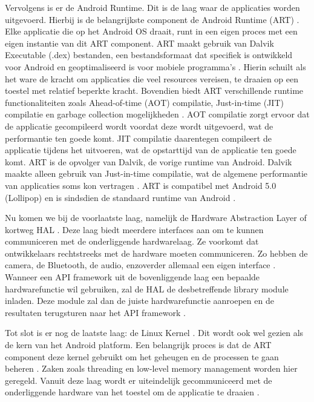 Vervolgens is er de Android Runtime. Dit is de laag waar de applicaties worden uitgevoerd. Hierbij is de belangrijkste component de Android Runtime (ART) \autocite{Bron7}. Elke applicatie die op het Android OS draait, runt in een eigen proces met een eigen instantie van dit ART component. ART maakt gebruik van Dalvik Executable (.dex) bestanden, een bestandsformaat dat specifiek is ontwikkeld voor Android en geoptimaliseerd is voor mobiele programma's \autocite{Bron14}. Hierin schuilt als het ware de kracht om applicaties die veel resources vereisen, te draaien op een toestel met relatief beperkte kracht. Bovendien biedt ART verschillende runtime functionaliteiten zoals Ahead-of-time (AOT) compilatie, Just-in-time (JIT) compilatie en garbage collection mogelijkheden \autocite{Bron7, Bron14}. AOT compilatie zorgt ervoor dat de applicatie gecompileerd wordt voordat deze wordt uitgevoerd, wat de performantie ten goede komt. JIT compilatie daarentegen compileert de applicatie tijdens het uitvoeren, wat de opstarttijd van de applicatie ten goede komt. ART is de opvolger van Dalvik, de vorige runtime van Android. Dalvik maakte alleen gebruik van Just-in-time compilatie, wat de algemene performantie van applicaties soms kon vertragen \autocite{Bron13}. ART is compatibel met Android 5.0 (Lollipop) en is sindsdien de standaard runtime van Android \autocite{Bron7, Bron13}.

Nu komen we bij de voorlaatste laag, namelijk de Hardware Abstraction Layer of kortweg HAL \autocite{Bron7}. Deze laag biedt meerdere interfaces aan om te kunnen communiceren met de onderliggende hardwarelaag. Ze voorkomt dat ontwikkelaars rechtstreeks met de hardware moeten communiceren. Zo hebben de camera, de Bluetooth, de audio, enzoverder allemaal een eigen interface \autocite{Bron7}. Wanneer een API framework uit de bovenliggende laag een bepaalde hardwarefunctie wil gebruiken, zal de HAL de desbetreffende library module inladen. Deze module zal dan de juiste hardwarefunctie aanroepen en de resultaten terugsturen naar het API framework \autocite{Bron7}.

Tot slot is er nog de laatste laag: de Linux Kernel \autocite{Bron7, Bron13}. Dit wordt ook wel gezien als de kern van het Android platform. Een belangrijk proces is dat de ART component deze kernel gebruikt om het geheugen en de processen te gaan beheren \autocite{Bron7, Bron13}. Zaken zoals threading en low-level memory management worden hier geregeld. Vanuit deze laag wordt er uiteindelijk gecommuniceerd met de onderliggende hardware van het toestel om de applicatie te draaien \autocite{Bron13}.

